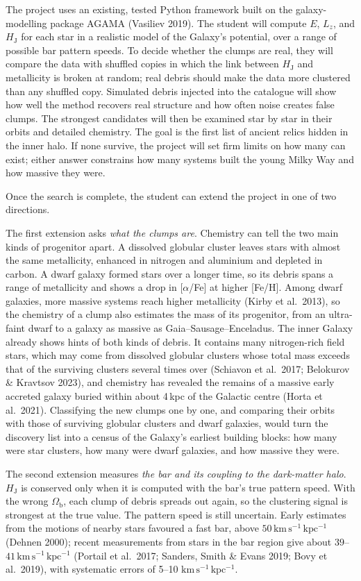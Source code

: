\documentclass[11pt,a4paper]{article}
\begin{document}
The project uses an existing, tested Python framework built on the galaxy-modelling package AGAMA (Vasiliev 2019). The student will compute $E$, $L_z$, and $H_\mathrm{J}$ for each star in a realistic model of the Galaxy's potential, over a range of possible bar pattern speeds. To decide whether the clumps are real, they will compare the data with shuffled copies in which the link between $H_\mathrm{J}$ and metallicity is broken at random; real debris should make the data more clustered than any shuffled copy. Simulated debris injected into the catalogue will show how well the method recovers real structure and how often noise creates false clumps. The strongest candidates will then be examined star by star in their orbits and detailed chemistry. The goal is the first list of ancient relics hidden in the inner halo. If none survive, the project will set firm limits on how many can exist; either answer constrains how many systems built the young Milky Way and how massive they were.

Once the search is complete, the student can extend the project in one of two directions.

The first extension asks \emph{what the clumps are}. Chemistry can tell the two main kinds of progenitor apart. A dissolved globular cluster leaves stars with almost the same metallicity, enhanced in nitrogen and aluminium and depleted in carbon. A dwarf galaxy formed stars over a longer time, so its debris spans a range of metallicity and shows a drop in [$\alpha$/Fe] at higher [Fe/H]. Among dwarf galaxies, more massive systems reach higher metallicity (Kirby et al.\ 2013), so the chemistry of a clump also estimates the mass of its progenitor, from an ultra-faint dwarf to a galaxy as massive as Gaia--Sausage--Enceladus. The inner Galaxy already shows hints of both kinds of debris. It contains many nitrogen-rich field stars, which may come from dissolved globular clusters whose total mass exceeds that of the surviving clusters several times over (Schiavon et al.\ 2017; Belokurov \& Kravtsov 2023), and chemistry has revealed the remains of a massive early accreted galaxy buried within about 4\,kpc of the Galactic centre (Horta et al.\ 2021). Classifying the new clumps one by one, and comparing their orbits with those of surviving globular clusters and dwarf galaxies, would turn the discovery list into a census of the Galaxy's earliest building blocks: how many were star clusters, how many were dwarf galaxies, and how massive they were.

The second extension measures \emph{the bar and its coupling to the dark-matter halo}. $H_\mathrm{J}$ is conserved only when it is computed with the bar's true pattern speed. With the wrong $\Omega_\mathrm{b}$, each clump of debris spreads out again, so the clustering signal is strongest at the true value. The pattern speed is still uncertain. Early estimates from the motions of nearby stars favoured a fast bar, above $50\,\mathrm{km\,s^{-1}\,kpc^{-1}}$ (Dehnen 2000); recent measurements from stars in the bar region give about $39$--$41\,\mathrm{km\,s^{-1}\,kpc^{-1}}$ (Portail et al.\ 2017; Sanders, Smith \& Evans 2019; Bovy et al.\ 2019), with systematic errors of 5--10 $\mathrm{km\,s^{-1}\,kpc^{-1}}$.
\end{document}
